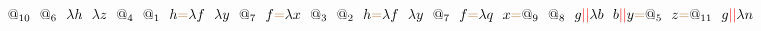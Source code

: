 \documentclass[a4paper, 10pt]{article}
\newcommand{\tikzmark}[3][]{\tikz[remember picture,baseline] \node [inner xsep=0pt,anchor=base,#1](#2) {#3};}
\begin{document}
\[\tikzmark{1}{$@_{10}$}\ \ \tikzmark{2}{$@_6$}\ \ \tikzmark{3}{$\lambda h$}\ \ \tikzmark{4}{$\lambda z$}\ \ \tikzmark{5}{$@_4$}\ \ \tikzmark{6}{$@_1$}\ \ \tikzmark{7}{$h$}\tikzmark{}{\color{brown}{=}}\tikzmark{8}{$\lambda f$}\ \ \tikzmark{9}{$\lambda y$}\ \ \tikzmark{10}{$@_7$}\ \ \tikzmark{11}{$f$}\tikzmark{}{\color{brown}{=}}\tikzmark{12}{$\lambda x$}\ \ \tikzmark{13}{$@_3$}\ \ \tikzmark{14}{$@_2$}\ \ \tikzmark{15}{$h$}\tikzmark{}{\color{brown}{=}}\tikzmark{16}{$\lambda f$}\ \ \tikzmark{17}{$\lambda y$}\ \ \tikzmark{18}{$@_7$}\ \ \tikzmark{19}{$f$}\tikzmark{}{\color{brown}{=}}\tikzmark{20}{$\lambda q$}\ \ \tikzmark{21}{$x$}\tikzmark{}{\color{brown}{=}}\tikzmark{22}{$@_9$}\ \ \tikzmark{23}{$@_8$}\ \ \tikzmark{24}{$g$}\tikzmark{}{\color{red}{||}}\tikzmark{25}{$\lambda b$}\ \ \tikzmark{26}{$b$}\tikzmark{}{\color{red}{||}}\tikzmark{27}{$y$}\tikzmark{}{\color{brown}{=}}\tikzmark{29}{$@_5$}\ \ \tikzmark{30}{$z$}\tikzmark{}{\color{brown}{=}}\tikzmark{31}{$@_{11}$}\ \ \tikzmark{32}{$g$}\tikzmark{}{\color{red}{||}}\tikzmark{33}{$\lambda n$}\]
\end{document}
